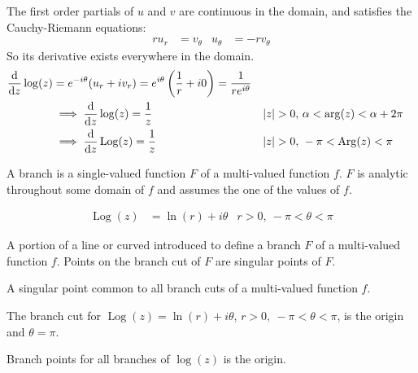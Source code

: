 \documentclass[12pt, english]{book}
\begin{document}
	The first order partials of \(u\) and \(v\) are continuous in the domain, and satisfies the Cauchy-Riemann equations:
	\begin{align*}
		ru_r &= v_\theta & u_\theta &= -rv_\theta
	\end{align*}
	So its derivative exists everywhere in the domain. 
	\begin{align*}
		\dv{z} \log(z) &= e^{-i\theta} (u_r + iv_r) = e^{i\theta} \left(\frac{1}{r} + i0\right) = \frac{1}{re^{i\theta}} \\
		&\implies \dv{z} \log(z) = \frac{1}{z} & \abs{z}>0,& \ \alpha < \arg(z) < \alpha + 2\pi\\
		&\implies \dv{z} \operatorname{Log}(z) = \frac{1}{z} & \abs{z}>0,& \ -\pi < \operatorname{Arg}(z) < \pi
	\end{align*}

	\begin{definition}[Branch]
		\label{Branch Definition - Complex}
		A branch is a single-valued function \(F\) of a multi-valued function \(f\). \(F\) is analytic throughout some domain of \(f\) and assumes the one of the values of \(f\).
	\end{definition}
	
	\begin{definition}
		\label{Principal Branch Definition - Complex}
		\begin{align*}
			\operatorname{Log}(z) &= \ln(r) + i\theta & r>0, \ -\pi < \theta < \pi
		\end{align*}
	\end{definition}

	\begin{definition}	
		\label{Branch Cut Definition - Complex}
		A portion of a line or curved introduced to define a branch \(F\) of a multi-valued function \(f\). Points on the branch cut of \(F\) are singular points of \(F\).
	\end{definition}

	\begin{definition}
		\label{Branch Point Definition - Complex}
		A singular point common to all branch cuts of a multi-valued function \(f\).
	\end{definition}

	\begin{example}
		The branch cut for \(\operatorname{Log}(z) = \ln(r) + i\theta\), \(r>0,\ -\pi<\theta<\pi\), is the origin and \(\theta = \pi\).
		
		Branch points for all branches of \(\log(z)\) is the origin.
	\end{example}
	
\end{document}
